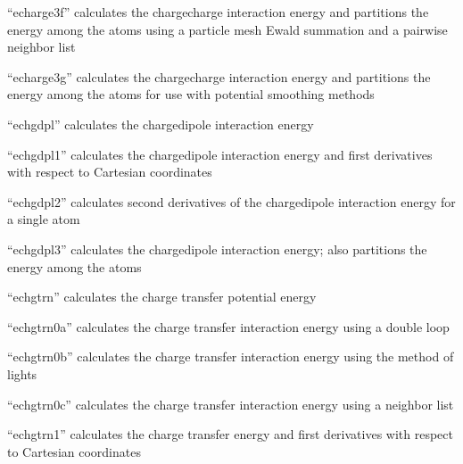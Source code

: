 \documentclass[letterpaper,11pt,english]{sphinxmanual}
\begin{document}

“echarge3f” calculates the charge\sphinxhyphen{}charge interaction energy
and partitions the energy among the atoms using a particle
mesh Ewald summation and a pairwise neighbor list


“echarge3g” calculates the charge\sphinxhyphen{}charge interaction energy
and partitions the energy among the atoms for use with
potential smoothing methods


“echgdpl” calculates the charge\sphinxhyphen{}dipole interaction energy


“echgdpl1” calculates the charge\sphinxhyphen{}dipole interaction energy
and first derivatives with respect to Cartesian coordinates


“echgdpl2” calculates second derivatives of the
charge\sphinxhyphen{}dipole interaction energy for a single atom


“echgdpl3” calculates the charge\sphinxhyphen{}dipole interaction energy;
also partitions the energy among the atoms


“echgtrn” calculates the charge transfer potential energy


“echgtrn0a” calculates the charge transfer interaction energy
using a double loop


“echgtrn0b” calculates the charge transfer interaction energy
using the method of lights


“echgtrn0c” calculates the charge transfer interaction energy
using a neighbor list


“echgtrn1” calculates the charge transfer energy and first
derivatives with respect to Cartesian coordinates

\end{document}
